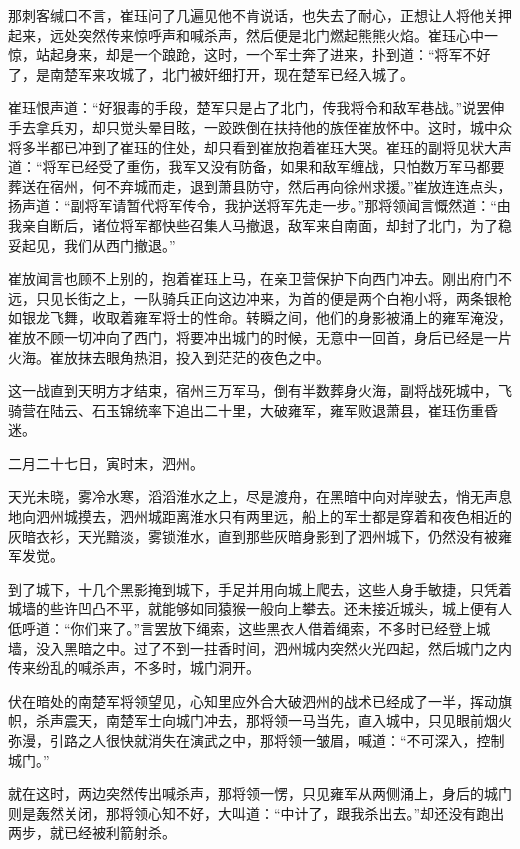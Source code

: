 那刺客缄口不言，崔珏问了几遍见他不肯说话，也失去了耐心，正想让人将他关押起来，远处突然传来惊呼声和喊杀声，然后便是北门燃起熊熊火焰。崔珏心中一惊，站起身来，却是一个踉跄，这时，一个军士奔了进来，扑到道：“将军不好了，是南楚军来攻城了，北门被奸细打开，现在楚军已经入城了。

崔珏恨声道：“好狠毒的手段，楚军只是占了北门，传我将令和敌军巷战。”说罢伸手去拿兵刃，却只觉头晕目眩，一跤跌倒在扶持他的族侄崔放怀中。这时，城中众将多半都已冲到了崔珏的住处，却只看到崔放抱着崔珏大哭。崔珏的副将见状大声道：“将军已经受了重伤，我军又没有防备，如果和敌军缠战，只怕数万军马都要葬送在宿州，何不弃城而走，退到萧县防守，然后再向徐州求援。”崔放连连点头，扬声道：“副将军请暂代将军传令，我护送将军先走一步。”那将领闻言慨然道：“由我亲自断后，诸位将军都快些召集人马撤退，敌军来自南面，却封了北门，为了稳妥起见，我们从西门撤退。”

崔放闻言也顾不上别的，抱着崔珏上马，在亲卫营保护下向西门冲去。刚出府门不远，只见长街之上，一队骑兵正向这边冲来，为首的便是两个白袍小将，两条银枪如银龙飞舞，收取着雍军将士的性命。转瞬之间，他们的身影被涌上的雍军淹没，崔放不顾一切冲向了西门，将要冲出城门的时候，无意中一回首，身后已经是一片火海。崔放抹去眼角热泪，投入到茫茫的夜色之中。

这一战直到天明方才结束，宿州三万军马，倒有半数葬身火海，副将战死城中，飞骑营在陆云、石玉锦统率下追出二十里，大破雍军，雍军败退萧县，崔珏伤重昏迷。

二月二十七日，寅时末，泗州。

天光未晓，雾冷水寒，滔滔淮水之上，尽是渡舟，在黑暗中向对岸驶去，悄无声息地向泗州城摸去，泗州城距离淮水只有两里远，船上的军士都是穿着和夜色相近的灰暗衣衫，天光黯淡，雾锁淮水，直到那些灰暗身影到了泗州城下，仍然没有被雍军发觉。

到了城下，十几个黑影掩到城下，手足并用向城上爬去，这些人身手敏捷，只凭着城墙的些许凹凸不平，就能够如同猿猴一般向上攀去。还未接近城头，城上便有人低呼道：“你们来了。”言罢放下绳索，这些黑衣人借着绳索，不多时已经登上城墙，没入黑暗之中。过了不到一拄香时间，泗州城内突然火光四起，然后城门之内传来纷乱的喊杀声，不多时，城门洞开。

伏在暗处的南楚军将领望见，心知里应外合大破泗州的战术已经成了一半，挥动旗帜，杀声震天，南楚军士向城门冲去，那将领一马当先，直入城中，只见眼前烟火弥漫，引路之人很快就消失在演武之中，那将领一皱眉，喊道：“不可深入，控制城门。”

就在这时，两边突然传出喊杀声，那将领一愣，只见雍军从两侧涌上，身后的城门则是轰然关闭，那将领心知不好，大叫道：“中计了，跟我杀出去。”却还没有跑出两步，就已经被利箭射杀。

